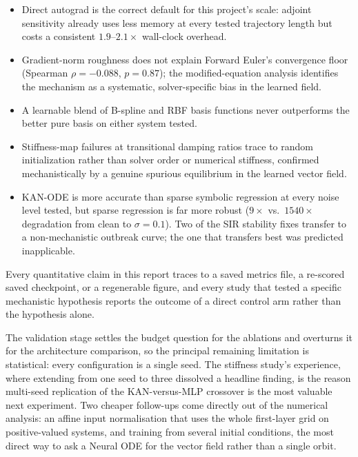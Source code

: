 \begin{itemize}
\item Direct autograd is the correct default for this project's scale:
  adjoint sensitivity already uses less memory at every tested trajectory
  length but costs a consistent $1.9$--$2.1\times$ wall-clock overhead.
\item Gradient-norm roughness does not explain Forward Euler's convergence
  floor (Spearman $\rho=-0.088$, $p=0.87$); the modified-equation analysis
  identifies the mechanism as a systematic, solver-specific bias in the
  learned field.
\item A learnable blend of B-spline and RBF basis functions never outperforms
  the better pure basis on either system tested.
\item Stiffness-map failures at transitional damping ratios trace to random
  initialization rather than solver order or numerical stiffness, confirmed
  mechanistically by a genuine spurious equilibrium in the learned vector
  field.
\item KAN-ODE is more accurate than sparse symbolic regression at every noise
  level tested, but sparse regression is far more robust ($9\times$ vs.\
  $1540\times$ degradation from clean to $\sigma=0.1$). Two of the SIR
  stability fixes transfer to a non-mechanistic outbreak curve; the
  one that transfers best was predicted inapplicable.
\end{itemize}

Every quantitative claim in this report traces to a saved metrics file, a
re-scored saved checkpoint, or a regenerable figure, and every study that tested a specific mechanistic
hypothesis reports the outcome of a direct control arm rather than the
hypothesis alone.

The validation stage settles the budget question for the ablations and
overturns it for the architecture comparison, so the principal remaining
limitation is statistical: every configuration is a single seed. The
stiffness study's experience, where extending from one seed to three
dissolved a headline finding, is the reason multi-seed replication of the
KAN-versus-MLP crossover is the most valuable next experiment. Two cheaper
follow-ups come directly out of the numerical analysis: an affine input
normalisation that uses the whole first-layer grid on positive-valued
systems, and training from several initial conditions, the most direct way
to ask a Neural ODE for the vector field rather than a single orbit.

\FloatBarrier

